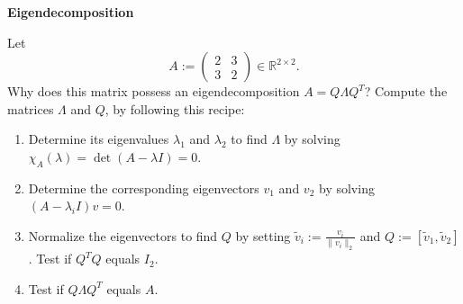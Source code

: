 \textbf{Eigendecomposition}

Let $$A:=\begin{pmatrix}2&3\\3&2 \end{pmatrix} \in \mathbb{R}^{2\times 2}. $$
Why does this matrix possess an eigendecomposition $A= Q \Lambda Q^T$? Compute the matrices $\Lambda$ and $Q$, by following this recipe:
\begin{enumerate}
\item Determine its eigenvalues $\lambda_1$ and $\lambda_2$ to find $\Lambda$ by solving $\chi_A(\lambda) = \det(A-\lambda I) = 0$.
\item Determine the corresponding eigenvectors $v_1$ and $v_2$ by solving $  (A-\lambda_i I )v = 0$.
\item Normalize the eigenvectors to find $Q$ by setting $\tilde{v}_i := \frac{v_i}{\|v_i\|_2}$ and $Q := [\tilde{v}_1,\tilde{v}_2]$. Test if $Q^TQ$ equals $I_2$.
\item Test if $Q \Lambda Q^T$ equals $A$.
\end{enumerate}

